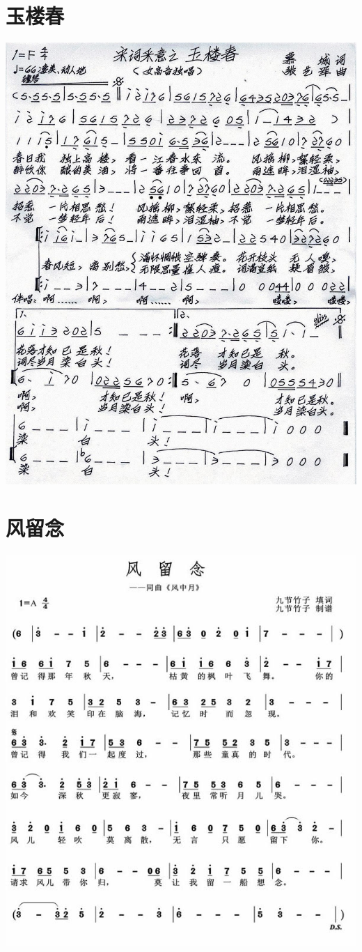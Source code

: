 \documentclass[cn,pad,chinese,chinesefont=nofont]{elegantbook}
\begin{document}
\section{玉楼春}
    \includegraphics[width=\textwidth]{dongxiao/20200323玉楼春.jpg}
    
\section{风留念}
    \includegraphics[width=\textwidth]{dongxiao/20200323风留念.jpg}
\end{document}

